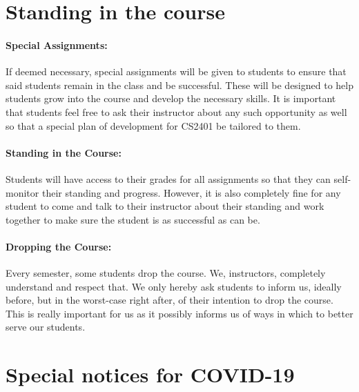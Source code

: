 \documentclass[12pt]{scrartcl}
\newcommand{\change}[2]{#2}
\begin{document}
\section{Standing in the course}

\paragraph{Special Assignments:} 
\change{will be given to students i}{I}f deemed necessary, \change{which will need to be completed}{special assignments will be given to students} to ensure that said students remain in the class and be successful. 
These will be designed to help students grow into the course and develop the necessary skills.
It is important that students feel free to ask their instructor about any such opportunity as well so that a special plan of development for CS2401 be tailored to them.

\paragraph{Standing in the Course:} 

Students will have access to their grades for all assignments so that they can self-monitor their standing and progress. 
However, it is also completely fine for any student to come and talk to their instructor about their standing and work together to make sure the student is as successful as can be.

\paragraph{Dropping the Course:} 
Every semester, some students drop the course. We, instructors, completely understand and respect that. We only hereby ask students to inform us, ideally before, but in the worst-case right after, of their intention to drop the course. This is really important for us as it possibly informs us of ways in which to better serve our students.


\section{Special notices for COVID-19}
\end{document}
